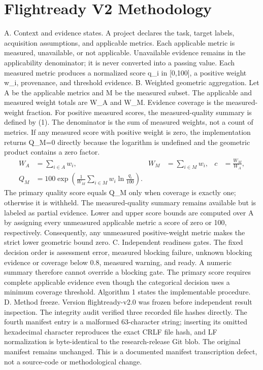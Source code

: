 \documentclass[conference]{IEEEtran}
\begin{document}
\section{Flightready V2 Methodology}
A. Context and evidence states. A project declares the task, target labels, acquisition assumptions, and applicable metrics. Each applicable metric is measured, unavailable, or not applicable. Unavailable evidence remains in the applicability denominator; it is never converted into a passing value. Each measured metric produces a normalized score q\_i in [0,100], a positive weight w\_i, provenance, and threshold evidence.
B. Weighted geometric aggregation. Let A be the applicable metrics and M be the measured subset. The applicable and measured weight totals are W\_A and W\_M. Evidence coverage is the measured-weight fraction. For positive measured scores, the measured-quality summary is defined by (1). The denominator is the sum of measured weights, not a count of metrics. If any measured score with positive weight is zero, the implementation returns Q\_M=0 directly because the logarithm is undefined and the geometric product contains a zero factor.
\begin{align}W_A&=\sum_{i\in A}w_i, & W_M&=\sum_{i\in M}w_i, & c&=\frac{W_M}{W_A},\\ Q_M&=100\exp\!\left(\frac{1}{W_M}\sum_{i\in M}w_i\ln\frac{q_i}{100}\right).\end{align}
The primary quality score equals Q\_M only when coverage is exactly one; otherwise it is withheld. The measured-quality summary remains available but is labeled as partial evidence. Lower and upper score bounds are computed over A by assigning every unmeasured applicable metric a score of zero or 100, respectively. Consequently, any unmeasured positive-weight metric makes the strict lower geometric bound zero.
C. Independent readiness gates. The fixed decision order is assessment error, measured blocking failure, unknown blocking evidence or coverage below 0.8, measured warning, and ready. A numeric summary therefore cannot override a blocking gate. The primary score requires complete applicable evidence even though the categorical decision uses a minimum coverage threshold. Algorithm 1 states the implementable procedure.
D. Method freeze. Version flightready-v2.0 was frozen before independent result inspection. The integrity audit verified three recorded file hashes directly. The fourth manifest entry is a malformed 63-character string; inserting its omitted hexadecimal character reproduces the exact CRLF file hash, and LF normalization is byte-identical to the research-release Git blob. The original manifest remains unchanged. This is a documented manifest transcription defect, not a source-code or methodological change.
\end{document}
